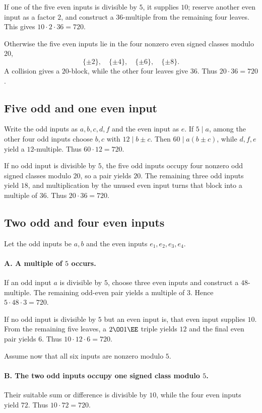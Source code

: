 If one of the five even inputs is divisible by $5$, it supplies $10$; reserve
another even input as a factor $2$, and construct a $36$-multiple from the
remaining four leaves.  This gives $10\cdot2\cdot36=720$.

Otherwise the five even inputs lie in the four nonzero even signed classes modulo $20$,\[\{\pm2\},\quad\{\pm4\},\quad\{\pm6\},\quad\{\pm8\}.\]  A collision gives a
$20$-block, while the other four leaves give $36$.  Thus
$20\cdot36=720$.

\subsection{Five odd and one even input}\label{app:six5}

Write the odd inputs as $a,b,c,d,f$ and the even input as $e$.  If
$5\mid a$, among the other four odd inputs choose $b,c$ with
$12\mid b\pm c$.  Then $60\mid a(b\pm c)$, while $d,f,e$ yield a
$12$-multiple.  Thus $60\cdot12=720$.

If no odd input is divisible by $5$, the five odd inputs occupy four nonzero
odd signed classes modulo $20$, so a pair yields $20$.  The remaining three
odd inputs yield $18$, and multiplication by the unused even input turns that
block into a multiple of $36$.  Thus $20\cdot36=720$.

\subsection{Two odd and four even inputs}\label{app:six2}

Let the odd inputs be $a,b$ and the even inputs
$e_1,e_2,e_3,e_4$.

\paragraph{A. A multiple of $5$ occurs.}
If an odd input $a$ is divisible by $5$, choose three even inputs and
construct a $48$-multiple.  The remaining odd-even pair yields a multiple of
$3$.  Hence $5\cdot48\cdot3=720$.

If no odd input is divisible by $5$ but an even input is, that even input
supplies $10$.  From the remaining five leaves, a $2\OO1\EE$ triple yields
$12$ and the final even pair yields $6$.  Thus $10\cdot12\cdot6=720$.

Assume now that all six inputs are nonzero modulo $5$.

\paragraph{B. The two odd inputs occupy one signed class modulo $5$.}
Their suitable sum or difference is divisible by $10$, while the four even
inputs yield $72$.  Thus $10\cdot72=720$.

